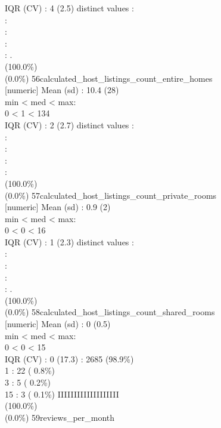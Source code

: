 \documentclass[
  journal,
]{IEEEtran}%
\begin{document}
IQR (CV) : 4 (2.5)  distinct values \textbar{} \textbar:\\
:\\
:\\
:\\
: . \\
(100.0\%) \\
(0.0\%) \textbar{} \textbar{}
56\textbar calculated\_host\_listings\_count\_entire\_homes\\
{[}numeric{]} \textbar Mean (sd) : 10.4 (28)\\
min \textless{} med \textless{} max:\\
0 \textless{} 1 \textless{} 134\\
IQR (CV) : 2 (2.7)  distinct values \textbar{} \textbar:\\
:\\
:\\
:\\
: \\
(100.0\%) \\
(0.0\%) \textbar{} \textbar{}
57\textbar calculated\_host\_listings\_count\_private\_rooms\\
{[}numeric{]} \textbar Mean (sd) : 0.9 (2)\\
min \textless{} med \textless{} max:\\
0 \textless{} 0 \textless{} 16\\
IQR (CV) : 1 (2.3)  distinct values \textbar{} \textbar:\\
:\\
:\\
:\\
: . \\
(100.0\%) \\
(0.0\%) \textbar{} \textbar{}
58\textbar calculated\_host\_listings\_count\_shared\_rooms\\
{[}numeric{]} \textbar Mean (sd) : 0 (0.5)\\
min \textless{} med \textless{} max:\\
0 \textless{} 0 \textless{} 15\\
IQR (CV) : 0 (17.3)  : 2685 (98.9\%)\\
1 : 22 ( 0.8\%)\\
3 : 5 ( 0.2\%)\\
15 : 3 ( 0.1\%) \textbar{} \textbar IIIIIIIIIIIIIIIIIII ~ ~ ~
\\
(100.0\%) \\
(0.0\%) \textbar{} \textbar{} 59\textbar reviews\_per\_month\\
\end{document}
